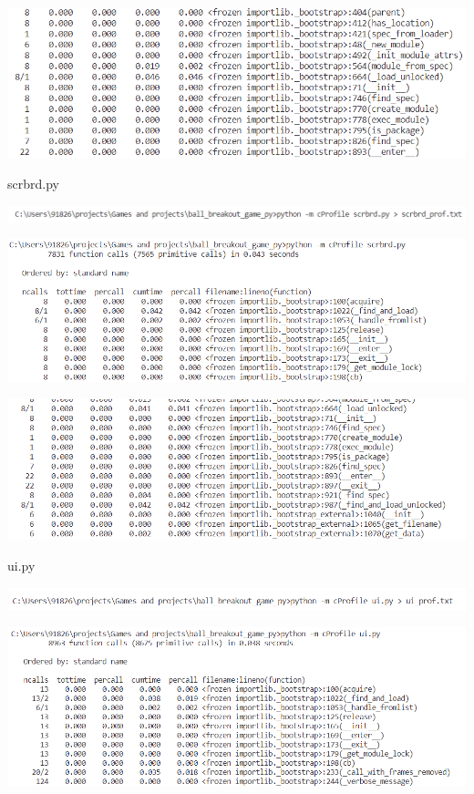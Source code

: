 \documentclass{article}
\begin{document}
\begin{center}{\centering\includegraphics[scale=0.70]{python_pdle_prof_02}}\end{center}
scrbrd.py
\begin{center}{\centering\includegraphics[scale=0.75]{python_scrbrd_prof_00}}\end{center}
\begin{center}{\centering\includegraphics[scale=0.70]{python_scrbrd_prof_01}}\end{center}
\begin{center}{\centering\includegraphics[scale=0.70]{python_scrbrd_prof_02}}\end{center}
ui.py
\begin{center}{\centering\includegraphics[scale=0.75]{python_ui_prof_00}}\end{center}
\begin{center}{\centering\includegraphics[scale=0.70]{python_ui_prof_01}}\end{center}
\end{document}
